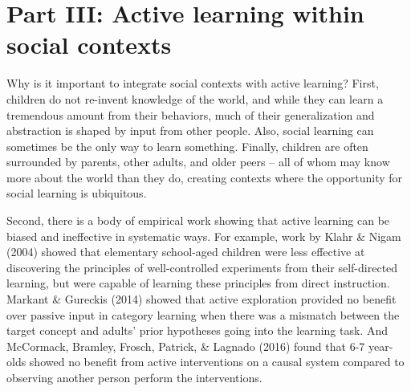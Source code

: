 \documentclass[oneside]{report}
\begin{document}
\hypertarget{active_social}{%
\section{Part III: Active learning within social
contexts}\label{active_social}}

Why is it important to integrate social contexts with active learning?
First, children do not re-invent knowledge of the world, and while they
can learn a tremendous amount from their behaviors, much of their
generalization and abstraction is shaped by input from other people.
Also, social learning can sometimes be the only way to learn something.
Finally, children are often surrounded by parents, other adults, and
older peers -- all of whom may know more about the world than they do,
creating contexts where the opportunity for social learning is
ubiquitous.

Second, there is a body of empirical work showing that active learning
can be biased and ineffective in systematic ways. For example, work by
Klahr \& Nigam (2004) showed that elementary school-aged children were
less effective at discovering the principles of well-controlled
experiments from their self-directed learning, but were capable of
learning these principles from direct instruction. Markant \& Gureckis
(2014) showed that active exploration provided no benefit over passive
input in category learning when there was a mismatch between the target
concept and adults' prior hypotheses going into the learning task. And
McCormack, Bramley, Frosch, Patrick, \& Lagnado (2016) found that 6-7
year-olds showed no benefit from active interventions on a causal system
compared to observing another person perform the interventions.
\end{document}

